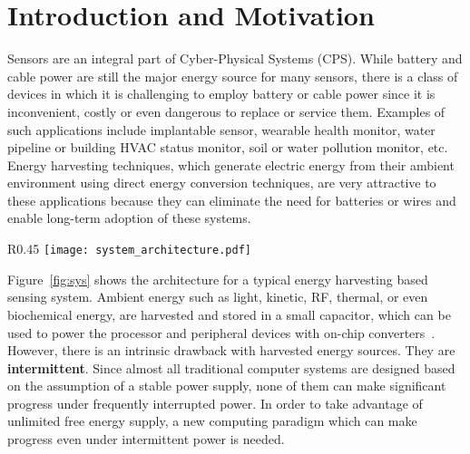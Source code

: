 
\graphicspath{{./figs/}{./figs/item-jingtong/}}

\section{Introduction and Motivation}

Sensors are an integral part of Cyber-Physical Systems (CPS).  
While battery and cable power are still the major energy source for many sensors, there is a class of devices in which it is challenging to employ battery or cable power since it is inconvenient, costly or even dangerous to replace or service them. Examples of such applications include implantable sensor, wearable health monitor, water pipeline or building HVAC status monitor, soil or water pollution monitor, etc.
Energy harvesting techniques, which generate electric energy from their ambient environment using direct energy conversion techniques, are very attractive to these applications because they can eliminate
the need for batteries or wires and enable long-term adoption of these systems.

\begin{wrapfigure}{R}{0.45\linewidth} 
\vspace{-25pt}
\centering
\texttt{[image: system\_architecture.pdf]}
\vspace{-35pt}
\caption{Energy Harvesting System}
\label{fig:sys}
\vspace{-6pt}
\end{wrapfigure}

Figure~\ref{fig:sys} shows the architecture for a typical energy harvesting based sensing system.
Ambient energy such as light, kinetic, RF, thermal, or even biochemical energy, are harvested and stored in a small capacitor, which can be used to power the processor and peripheral devices with on-chip converters~\cite{Tida:2014:NTI:2686762.2637481}. However, there is an intrinsic drawback with harvested energy sources. They are \textbf{intermittent}. Since almost all traditional computer systems are designed based on the assumption of a stable power supply, none of them can make significant progress under frequently interrupted power. In order to take advantage of unlimited free energy supply, a new computing paradigm which can make progress even under intermittent power is needed.

